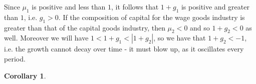 \documentclass{article}
\theoremstyle{definition}
\theoremstyle{plain}
\theoremstyle{theorem}
\newtheorem{corollary}{Corollary}[section]
\begin{document}
Since $\mu_1$ is positive and less than $1$, it follows that $1+g_1$ is positive and greater than $1$, i.e. $g_1 > 0$. If the composition of capital for the wage goods industry is greater than that of the capital goods industry, then $\mu_2 < 0$ and so $1+g_2 < 0$ as well. Moreover we will have $1 < 1+g_1 < |1+g_2|$, so we have that $1+g_2 < -1$, i.e. the growth cannot decay over time - it must blow up, as it oscillates every period. 
\begin{corollary}
	
\end{corollary}
\end{document}

